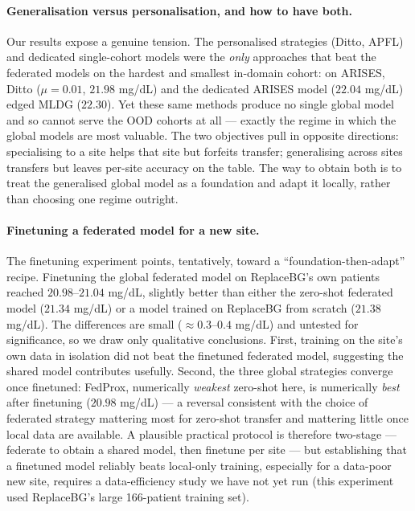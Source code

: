 \documentclass[10pt,letterpaper]{article}
\begin{document}
\paragraph{Generalisation versus personalisation, and how to have both.} Our
results expose a genuine tension. The personalised strategies (Ditto, APFL) and
dedicated single-cohort models were the \emph{only} approaches that beat the
federated models on the hardest and smallest in-domain cohort: on ARISES, Ditto
($\mu{=}0.01$, $21.98$ mg/dL) and the dedicated ARISES model ($22.04$ mg/dL) edged
MLDG ($22.30$). Yet these same methods produce no single global model and so
cannot serve the OOD cohorts at all --- exactly the regime in which the global
models are most valuable. The two objectives pull in opposite directions:
specialising to a site helps that site but forfeits transfer; generalising across
sites transfers but leaves per-site accuracy on the table. The way to obtain both
is to treat the generalised global model as a foundation and adapt it locally,
rather than choosing one regime outright.

\paragraph{Finetuning a federated model for a new site.} The finetuning
experiment points, tentatively, toward a ``foundation-then-adapt'' recipe.
Finetuning the global federated model on ReplaceBG's own patients reached
$20.98$--$21.04$ mg/dL, slightly better than either the zero-shot federated model
($21.34$ mg/dL) or a model trained on ReplaceBG from scratch ($21.38$ mg/dL). The
differences are small ($\approx 0.3$--$0.4$ mg/dL) and untested for significance,
so we draw only qualitative conclusions. First, training on the site's own data
in isolation did not beat the finetuned federated model, suggesting the shared
model contributes usefully. Second, the three global strategies converge once
finetuned: FedProx, numerically \emph{weakest} zero-shot here, is numerically
\emph{best} after finetuning ($20.98$ mg/dL) --- a reversal consistent with the
choice of federated strategy mattering most for zero-shot transfer and mattering
little once local data are available. A
plausible practical protocol is therefore two-stage --- federate to obtain a
shared model, then finetune per site --- but establishing that a finetuned model
reliably beats local-only training, especially for a data-poor new site, requires
a data-efficiency study we have not yet run (this experiment used ReplaceBG's
large 166-patient training set).
\end{document}
